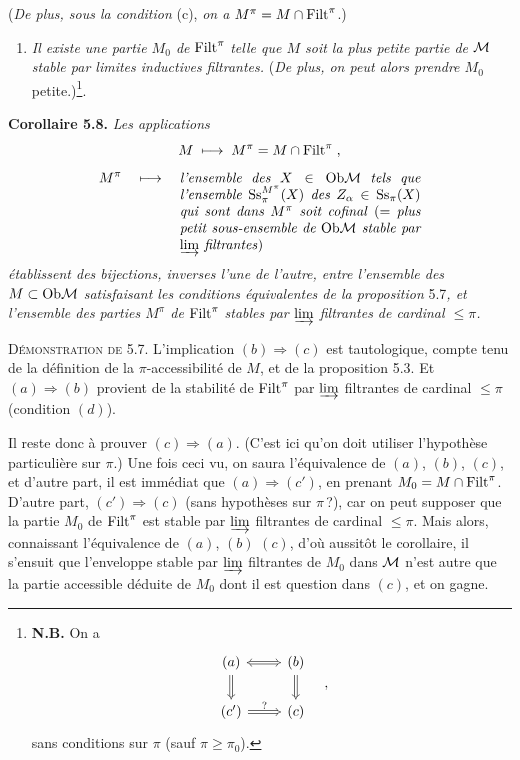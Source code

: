 (\textit{De plus, sous la condition} (c), \textit{on a}
$M^\pi = M \cap \mathrm{Filt}^\pi$.)
\begin{enumerate}[label={}]
\item[c$'$)] \textit{Il existe une partie $M_0$ de} $\mathrm{Filt}^\pi$ \textit{telle que $M$ soit la plus petite partie de $\mathcal{M}$ stable par limites inductives filtrantes.} (\textit{De plus, on peut alors prendre $M_0$} petite.)\footnote[22]{\textbf{N.B.} On a
\[
\begin{tikzcd}[ampersand replacement=\&]
(a) \arrow[r, Leftrightarrow] \arrow[d, Rightarrow] \& (b) \arrow[d, Rightarrow] \\
(c') \arrow[r, Rightarrow, "?"] \& (c)
\end{tikzcd}
\quad ,
\]
sans conditions sur $\pi$ (sauf $\pi \geq \pi_0$).}.
\end{enumerate}

\textbf{Corollaire 5.8.} \textit{Les applications}
\[
M \;\longmapsto\; M^\pi = M \cap \mathrm{Filt}^\pi \;,
\]
\[
M^\pi \quad\longmapsto\quad \parbox[t]{0.5\textwidth}{\textit{l'ensemble des $X \in \Ob\M$ tels que l'ensemble $\Ss_\pi^{M^\pi}(X)$ des $Z_\alpha \in \Ss_\pi(X)$ qui sont dans $M^\pi$ soit cofinal} (= \textit{plus petit sous-ensemble de $\Ob\M$ stable par $\varinjlim$ filtrantes})}
\]
\textit{établissent des bijections, inverses l'une de l'autre, entre l'ensemble des $M \subset \mathrm{Ob}\mathcal{M}$ satisfaisant les conditions équivalentes de la proposition} 5.7\textit{, et l'ensemble des parties $M^\pi$ de} $\mathrm{Filt}^\pi$ \textit{stables par $\varinjlim$ filtrantes de cardinal $\leq \pi$.}

\textsc{Démonstration de} 5.7. L'implication $(b) \Longrightarrow (c)$ est tautologique, compte tenu de la définition de la $\pi$-accessibilité de $M$, et de la proposition 5.3. Et $(a) \Longrightarrow (b)$ provient de la stabilité de $\mathrm{Filt}^\pi$ par $\varinjlim$ filtrantes de cardinal $\leq \pi$ (condition $(d)$).

Il reste donc à prouver $(c) \Longrightarrow (a)$. (C'est ici qu'on doit utiliser l'hypothèse particulière sur $\pi$.) Une fois ceci vu, on saura l'équivalence de $(a)$, $(b)$, $(c)$, et d'autre part, il est immédiat que $(a) \Longrightarrow (c')$, en
prenant $M_0 = M \cap \mathrm{Filt}^\pi$. D'autre part, $(c') \Longrightarrow (c)$ (sans hypothèses sur $\pi\,$?), car on peut supposer que la partie $M_0$ de $\mathrm{Filt}^\pi$ est stable par $\varinjlim$ filtrantes de cardinal $\leq \pi$. Mais alors, connaissant l'équivalence de $(a)$, $(b)$ $(c)$, d'où aussitôt le corollaire, il s'ensuit que l'enveloppe stable par $\varinjlim$ filtrantes de $M_0$ dans $\mathcal{M}$ n'est autre que la partie accessible déduite de $M_0$ dont il est question dans $(c)$, et on gagne. %

